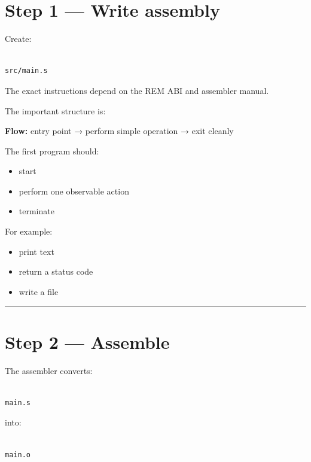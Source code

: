 \documentclass[
  oneside,
  openany]{book}
\providecommand{\tightlist}{%
  \setlength{\itemsep}{0pt}\setlength{\parskip}{0pt}}
\begin{document}
\hypertarget{step-1-write-assembly}{%
\section{Step 1 --- Write assembly}\label{step-1-write-assembly}}

Create:

\begin{verbatim}

src/main.s
\end{verbatim}

The exact instructions depend on the REM ABI and assembler manual.

The important structure is:

\textbf{Flow:} entry point → perform simple operation → exit cleanly

The first program should:

\begin{itemize}
\tightlist
\item
  start
\item
  perform one observable action
\item
  terminate
\end{itemize}

For example:

\begin{itemize}
\tightlist
\item
  print text
\item
  return a status code
\item
  write a file
\end{itemize}

\begin{center}\rule{0.5\linewidth}{0.5pt}\end{center}

\hypertarget{step-2-assemble}{%
\section{Step 2 --- Assemble}\label{step-2-assemble}}

The assembler converts:

\begin{verbatim}

main.s
\end{verbatim}

into:

\begin{verbatim}

main.o
\end{verbatim}
\end{document}
